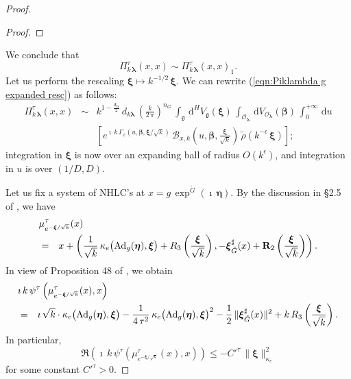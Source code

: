 \documentclass[12pt,a4paper]{article}
\theoremstyle{plain}
\theoremstyle{definition}
\begin{document}
\begin{proof}
\begin{proof}
\end{proof}

We conclude that 
\begin{equation}
\label{eqn:Pi is Pi1}
\Pi^\tau_{k\,\boldsymbol{\lambda}}(x,x)\sim 
\Pi^\tau_{k\,\boldsymbol{\lambda}}(x,x)_1.
\end{equation}
%
Let us perform the rescaling $\boldsymbol{\xi}\mapsto k^{-1/2}\,\boldsymbol{\xi}$.
We can rewrite (\ref{eqn:Piklambda g expanded resc}) as follows:
%
\begin{eqnarray}
\label{eqn:Piklambda g expanded resc resc}
\Pi^\tau_{k\,\boldsymbol{\lambda}}(x,x)&\sim&
%
k^{1-\frac{d_G}{2}}\,d_{k\boldsymbol{\lambda}}\,\left(\frac{k}{2\,\pi}\right)^{n_G}\,
\int_{\mathfrak{g}}\,
\mathrm{d}^HV_{\mathfrak{g}}(\boldsymbol{\xi})\,\int_{\mathcal{O}_{\boldsymbol{\lambda}}}\,
\mathrm{d}
V_{\mathcal{O}_{\boldsymbol{\lambda}}}(\boldsymbol{\beta})
\,\int_0^{+\infty}\,\mathrm{d}u
\nonumber
\\
&&\left[
 e^{\imath\,k\,\Gamma_x(u,\boldsymbol{\beta},\boldsymbol{\xi}/\sqrt{k})
}\,\mathcal{B}_{x,k}\left(u,\boldsymbol{\beta},\frac{\boldsymbol{\xi}}{\sqrt{k}}\right)\,\tilde{\rho}\left(k^{-\epsilon}\,\boldsymbol{\xi}\right)\right];
\end{eqnarray}
%
integration in $\boldsymbol{\xi}$ is now over an expanding ball of
radius $O\left(k^{\epsilon}\right)$, and integration in $u$ is
over $(1/D,D)$.

Let us fix a system of NHLC's at $x=g\,\exp^{\tilde{G}}(\imath\,\boldsymbol{\eta})$.
By the discussion in \S 2.5 of \cite{gp24},
we have
\begin{eqnarray}
\label{eqn:action diagon}
\lefteqn{\mu^\tau_{e^{-\boldsymbol{\xi}/\sqrt{k}}}(x)}\\
&=&
x+\left(
\frac{1}{\sqrt{k}}\,
\kappa_e\big( \mathrm{Ad}_g(\boldsymbol{\eta}),\boldsymbol{\xi}\big)
+R_3\left( \frac{\boldsymbol{\xi}}{\sqrt{k}}  \right),
-\boldsymbol{\xi}^\sharp_{\tilde{G}}(x)+\mathbf{R}_2\left( \frac{\boldsymbol{\xi}}{\sqrt{k}}  \right)\right).\nonumber
\end{eqnarray}
In view of Proposition 48 of \cite{p24}, we obtain
\begin{eqnarray}
\label{eqn:psi act diag}
\lefteqn{\imath\,k\,\psi^\tau\left(\mu^\tau_{e^{-\boldsymbol{\xi}/\sqrt{k}}}(x),x   \right)}\\
&=&\imath\,\sqrt{k}\cdot\kappa_e\big( \mathrm{Ad}_g(\boldsymbol{\eta}),\boldsymbol{\xi}\big)
-\frac{1}{4\,\tau^2}\,\kappa_e\big( \mathrm{Ad}_g(\boldsymbol{\eta}),\boldsymbol{\xi}\big)^2-\frac{1}{2}\,\|\boldsymbol{\xi}^\sharp_{\tilde{G}}(x)\|^2+k\,R_3\left( \frac{\boldsymbol{\xi}}{\sqrt{k}} \right). 
\nonumber
\end{eqnarray}
In particular,
\begin{equation}
\label{eqn:real part neg}
\Re\left(\imath\,k\,\psi^\tau\left(\mu^\tau_{e^{-\boldsymbol{\xi}/\sqrt{k}}}(x),x   \right)   \right)\le -{C'}^\tau\,\|\boldsymbol{\xi}\|^2_{\kappa_e}
\end{equation}
for some constant ${C'}^\tau>0$.


\end{proof}
\end{document}
